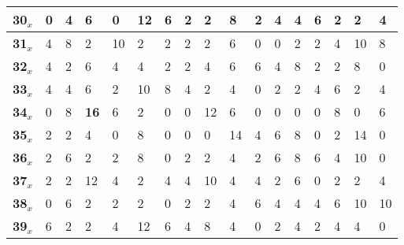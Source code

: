 \begin{longtable}[c]{|l|l|l|l|l|l|l|l|l|l|l|l|l|l|l|l|l|}
\textbf{30}$_x$ & 0          & 4          & 6          & 0          & 12         & 6          & 2          & 2          & 8          & 2          & 4          & 4          & 6          & 2          & 2          & 4          \\ \hline
\textbf{31}$_x$ & 4          & 8          & 2          & 10         & 2          & 2          & 2          & 2          & 6          & 0          & 0          & 2          & 2          & 4          & 10         & 8          \\ \hline
\textbf{32}$_x$ & 4          & 2          & 6          & 4          & 4          & 2          & 2          & 4          & 6          & 6          & 4          & 8          & 2          & 2          & 8          & 0          \\ \hline
\textbf{33}$_x$ & 4          & 4          & 6          & 2          & 10         & 8          & 4          & 2          & 4          & 0          & 2          & 2          & 4          & 6          & 2          & 4          \\ \hline
\textbf{34}$_x$ & 0          & 8          & \textbf{16}         & 6          & 2          & 0          & 0          & 12         & 6          & 0          & 0          & 0          & 0          & 8          & 0          & 6          \\ \hline
\textbf{35}$_x$ & 2          & 2          & 4          & 0          & 8          & 0          & 0          & 0          & 14         & 4          & 6          & 8          & 0          & 2          & 14         & 0          \\ \hline
\textbf{36}$_x$ & 2          & 6          & 2          & 2          & 8          & 0          & 2          & 2          & 4          & 2          & 6          & 8          & 6          & 4          & 10         & 0          \\ \hline
\textbf{37}$_x$ & 2          & 2          & 12         & 4          & 2          & 4          & 4          & 10         & 4          & 4          & 2          & 6          & 0          & 2          & 2          & 4          \\ \hline
\textbf{38}$_x$ & 0          & 6          & 2          & 2          & 2          & 0          & 2          & 2          & 4          & 6          & 4          & 4          & 4          & 6          & 10         & 10         \\ \hline
\textbf{39}$_x$ & 6          & 2          & 2          & 4          & 12         & 6          & 4          & 8          & 4          & 0          & 2          & 4          & 2          & 4          & 4          & 0          \\ \hline

\end{longtable}
